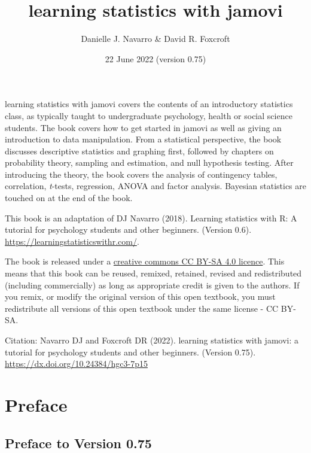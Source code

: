 \documentclass[
]{book}
\title{{learning statistics with jamovi}}
\author{Danielle J. Navarro \& David R. Foxcroft}
\date{22 June 2022 (version 0.75)}
\begin{document}
\maketitle

{
\setcounter{tocdepth}{1}
\tableofcontents
}
\hypertarget{section}{%
\chapter*{}\label{section}}

{learning statistics with jamovi} covers the contents of an introductory statistics class, as typically taught to undergraduate psychology, health or social science students. The book covers how to get started in jamovi as well as giving an introduction to data manipulation. From a statistical perspective, the book discusses descriptive statistics and graphing first, followed by chapters on probability theory, sampling and estimation, and null hypothesis testing. After introducing the theory, the book covers the analysis of contingency tables, correlation, \emph{t}-tests, regression, ANOVA and factor analysis. Bayesian statistics are touched on at the end of the book.

This book is an adaptation of DJ Navarro (2018). Learning statistics with R: A tutorial for psychology students and other beginners. (Version 0.6). \url{https://learningstatisticswithr.com/}.

The book is released under a \href{https://creativecommons.org/licenses/by-sa/4.0/}{creative commons CC BY-SA 4.0 licence}. This means that this book can be reused, remixed, retained, revised and redistributed (including commercially) as long as appropriate credit is given to the authors. If you remix, or modify the original version of this open textbook, you must redistribute all versions of this open textbook under the same license - CC BY-SA.

Citation: Navarro DJ and Foxcroft DR (2022). learning statistics with jamovi: a tutorial for psychology students and other beginners. (Version 0.75). \href{DOI:\%2010.24384/hgc3-7p15}{https://dx.doi.org/10.24384/hgc3-7p15}

\hypertarget{preface}{%
\chapter*{Preface}\label{preface}}

\hypertarget{preface-to-version-0.75}{%
\section*{Preface to Version 0.75}\label{preface-to-version-0.75}}
\end{document}
